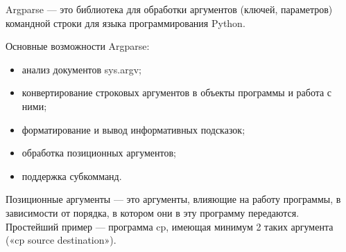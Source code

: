 
Argparse --- это библиотека для обработки аргументов (ключей, параметров) командной строки для языка программирования Python. 

Основные возможности Argparse:
\begin{itemize}
\item анализ документов sys.argv;
\item конвертирование строковых аргументов в объекты программы и работа с ними;
\item форматирование и вывод информативных подсказок;
\item обработка позиционных аргументов;
\item поддержка субкомманд.
\end{itemize}

Позиционные аргументы — это аргументы, влияющие на работу программы, в зависимости от порядка, в котором они в эту программу передаются. Простейший пример — программа cp, имеющая минимум 2 таких аргумента («cp source destination»).